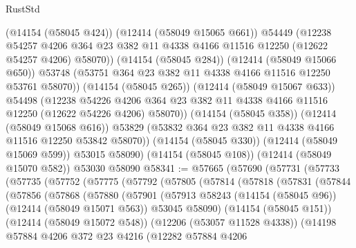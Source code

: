\begin{lexlean}{RustStd}
\begin{coremodule}
              (@14154 (@58045 @424))
              (@12414 (@58049 @15065 @661))
              @54449
              (@12238
                @54257
                @4206
                @364
                @23
                @382
                @11
                @4338
                @4166
                @11516
                @12250
                (@12622 @54257 @4206)
                @58070))
            (@14154 (@58045 @284))
            (@12414 (@58049 @15066 @650))
            @53748
            (@53751 @364 @23 @382 @11 @4338 @4166 @11516 @12250 @53761 @58070))
          (@14154 (@58045 @265))
          (@12414 (@58049 @15067 @633))
          @54498
          (@12238
            @54226
            @4206
            @364
            @23
            @382
            @11
            @4338
            @4166
            @11516
            @12250
            (@12622 @54226 @4206)
            @58070))
        (@14154 (@58045 @358))
        (@12414 (@58049 @15068 @616))
        @53829
        (@53832 @364 @23 @382 @11 @4338 @4166 @11516 @12250 @53842 @58070))
      (@14154 (@58045 @330))
      (@12414 (@58049 @15069 @599))
      @53015
      @58090)
    (@14154 (@58045 @108))
    (@12414 (@58049 @15070 @582))
    @53030
    @58090
@58341 := @57665
    (@57690
      (@57731
        (@57733
          (@57735
            (@57752
              (@57775
                (@57792
                  (@57805
                    (@57814
                      (@57818
                        (@57831
                          (@57844
                            (@57856
                              (@57868
                                (@57880
                                  (@57901
                                    (@57913
                                      @58243
                                      (@14154 (@58045 @96))
                                      (@12414 (@58049 @15071 @563))
                                      @53045
                                      @58090)
                                    (@14154 (@58045 @151))
                                    (@12414 (@58049 @15072 @548))
                                    (@12206 (@53057 @11528 @4338))
                                    (@14198
                                      @57884
                                      @4206
                                      @372
                                      @23
                                      @4216
                                      (@12282
                                        @57884
                                        @4206

\end{coremodule}
\end{lexlean}
